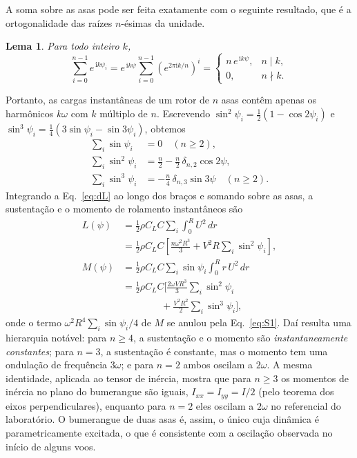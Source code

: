 \documentclass[aps,pre,twocolumn,superscriptaddress,nofootinbib,floatfix]{revtex4-2}
\newtheorem{lema}{Lema}
\begin{document}
A soma sobre as asas pode ser feita exatamente com o seguinte resultado, que é a ortogonalidade das raízes $n$-ésimas da unidade.

\begin{lema}
Para todo inteiro $k$,
\begin{equation}
  \sum_{i=0}^{n-1} e^{\,\mathrm{i}k\psi_i}
  = e^{\,\mathrm{i}k\psi}\sum_{i=0}^{n-1}\left(e^{2\pi\mathrm{i}k/n}\right)^{i}
  = \begin{cases} n\,e^{\,\mathrm{i}k\psi}, & n\mid k,\\[2pt] 0, & n\nmid k.\end{cases}
  \label{eq:lemma}
\end{equation}
\end{lema}

\noindent Portanto, as cargas instantâneas de um rotor de $n$ asas contêm apenas os harmônicos $k\omega$ com $k$ múltiplo de $n$. Escrevendo $\sin^2\psi_i=\tfrac12(1-\cos2\psi_i)$ e $\sin^3\psi_i=\tfrac14(3\sin\psi_i-\sin3\psi_i)$, obtemos
\begin{align}
  \sum_{i}\sin\psi_i &= 0 \quad (n\geq2), \label{eq:S1}\\
  \sum_{i}\sin^2\psi_i &= \frac n2 - \frac{n}{2}\,\delta_{n,2}\cos2\psi, \label{eq:S2}\\
  \sum_{i}\sin^3\psi_i &= -\frac{n}{4}\,\delta_{n,3}\sin3\psi \quad (n\geq2). \label{eq:S3}
\end{align}
Integrando a Eq.~\eqref{eq:dL} ao longo dos braços e somando sobre as asas, a sustentação e o momento de rolamento instantâneos são
\begin{align}
  L(\psi) &= \tfrac12\rho C_LC\sum_{i}\int_0^R U^2\,dr \nonumber\\
  &= \tfrac12\rho C_LC\left[\frac{n\omega^2R^3}{3} + V^2R\sum_i\sin^2\psi_i\right], \label{eq:Linst}\\
  M(\psi) &= \tfrac12\rho C_LC\sum_{i}\sin\psi_i\int_0^R r\,U^2\,dr \nonumber\\
  &= \tfrac12\rho C_LC\bigg[\frac{2\omega VR^3}{3}\sum_i\sin^2\psi_i \nonumber\\
  &\qquad\qquad + \frac{V^2R^2}{2}\sum_i\sin^3\psi_i\bigg], \label{eq:Minst}
\end{align}
onde o termo $\omega^2R^4\sum_i\sin\psi_i/4$ de $M$ se anulou pela Eq.~\eqref{eq:S1}. Daí resulta uma hierarquia notável: para $n\geq4$, a sustentação e o momento são \emph{instantaneamente constantes}; para $n=3$, a sustentação é constante, mas o momento tem uma ondulação de frequência $3\omega$; e para $n=2$ ambos oscilam a $2\omega$. A mesma identidade, aplicada ao tensor de inércia, mostra que para $n\geq3$ os momentos de inércia no plano do bumerangue são iguais, $I_{xx}=I_{yy}=I/2$ (pelo teorema dos eixos perpendiculares), enquanto para $n=2$ eles oscilam a $2\omega$ no referencial do laboratório. O bumerangue de duas asas é, assim, o único cuja dinâmica é parametricamente excitada, o que é consistente com a oscilação observada no início de alguns voos.
\end{document}
